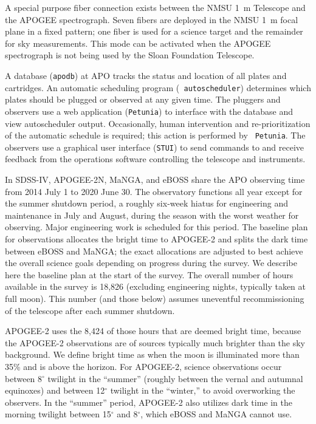 A special purpose fiber connection exists between the NMSU 1~m
Telescope and the APOGEE spectrograph. Seven fibers are deployed in
the NMSU 1~m focal plane in a fixed pattern; one fiber is used for
a science target and the remainder for sky measurements. This mode can
be activated when the APOGEE spectrograph is not being used by the
Sloan Foundation Telescope.

A database ({\tt apodb}) at APO tracks the status and location of all
plates and cartridges. An automatic scheduling program ({\tt
autoscheduler}) determines which plates should be plugged or observed
at any given time. The pluggers and observers use a web application
({\tt Petunia}) to interface with the database and view autoscheduler
output.  Occasionally, human intervention and re-prioritization of the
automatic schedule is required; this action is performed by {\tt
Petunia}.  The observers use a graphical user interface ({\tt STUI})
to send commands to and receive feedback from the operations software
controlling the telescope and instruments.

In SDSS-IV, APOGEE-2N, MaNGA, and eBOSS share the APO observing time
from 2014 July 1 to 2020 June 30. The observatory functions all year
except for the summer shutdown period, a roughly six-week hiatus for
engineering and maintenance in July and August, during the season with
the worst weather for observing.  Major engineering work is scheduled
for this period. The baseline plan for observations allocates the
bright time to APOGEE-2 and splits the dark time between eBOSS and
MaNGA; the exact allocations are adjusted to best achieve the overall
science goals depending on progress during the survey. We describe
here the baseline plan at the start of the survey. The overall number
of hours available in the survey is 18,826 (excluding engineering
nights, typically taken at full moon). This number (and those below)
assumes uneventful recommissioning of the telescope after each summer
shutdown.

APOGEE-2 uses the 8,424 of those hours that are deemed bright time,
because the APOGEE-2 observations are of sources typically much
brighter than the sky background. We define bright time as when the
moon is illuminated more than 35\% and is above the horizon. For
APOGEE-2, science observations occur between 8$^\circ$ twilight in the
``summer'' (roughly between the vernal and autumnal equinoxes) and
between 12$^\circ$ twilight in the ``winter,'' to avoid overworking
the observers. In the ``summer'' period, APOGEE-2 also utilizes dark
time in the morning twilight between 15$^\circ$ and 8$^\circ$, which
eBOSS and MaNGA cannot use.

